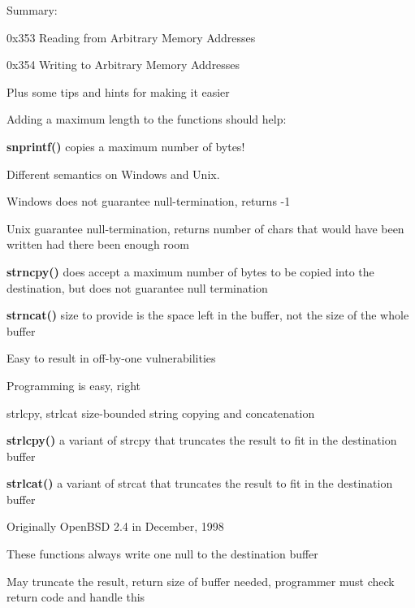 \documentclass[Screen16to9,17pt]{foils}
\begin{document}
Summary:
\begin{list2}
\item 0x353 Reading from Arbitrary Memory Addresses
\item 0x354 Writing to Arbitrary Memory Addresses
\item Plus some tips and hints for making it easier
\end{list2}


Adding a maximum length to the functions should help:
\begin{list2}
\item {\bf snprintf()} copies a maximum number of bytes!
\item Different semantics on Windows and Unix.
\item Windows does not guarantee null-termination, returns -1
\item Unix guarantee null-termination, returns number of chars that would have been written had there been enough room
\item {\bf strncpy()} does accept a maximum number of bytes to be copied into the destination, but does not guarantee null termination
\item {\bf strncat()} size to provide is the space left in the buffer, not the size of the whole buffer
\item Easy to result in off-by-one vulnerabilities
\end{list2}

\vskip 1cm

\centerline{Programming is easy, right \smiley}


\begin{list2}
\item strlcpy, strlcat  size-bounded string copying and concatenation
\item {\bf strlcpy()} a variant of strcpy that truncates the result to fit in the destination buffer
\item {\bf strlcat()} a variant of strcat that truncates the result to fit in the destination buffer
\item Originally OpenBSD 2.4 in December, 1998
\item These functions always write one null to the destination buffer
\item May truncate the result, return size of buffer needed, programmer must check return code and handle this
\end{list2}
\end{document}
